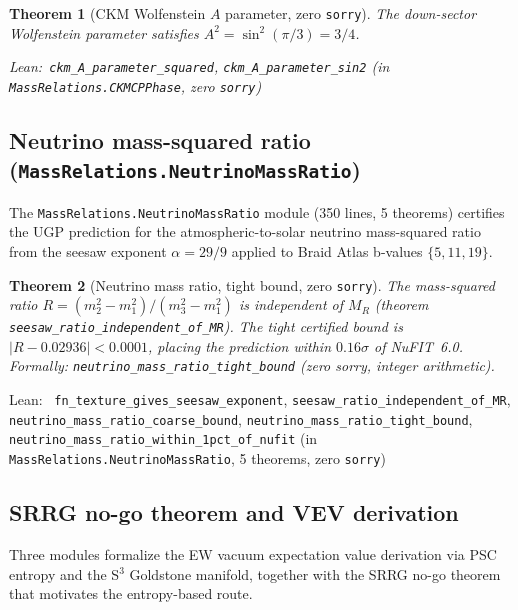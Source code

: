 \documentclass[11pt,a4paper]{article}
\newenvironment{leanref}%
  {\par\smallskip\noindent\begingroup\raggedright\textup{Lean:}~}%
  {\par\endgroup}
\newtheorem{theorem}{Theorem}[section]
\theoremstyle{definition}
\begin{document}
\begin{theorem}[CKM Wolfenstein $A$ parameter, zero \texttt{sorry}]\label{thm:ckm-a-parameter}
The down-sector Wolfenstein parameter satisfies $A^2=\sin^2(\pi/3)=3/4$.

\begin{leanref}\lstinline|ckm_A_parameter_squared|,
\lstinline|ckm_A_parameter_sin2|
\textup{(in \texttt{MassRelations.CKMCPPhase}, zero \texttt{sorry})}\end{leanref}
\end{theorem}

\subsection{Neutrino mass-squared ratio (\texttt{MassRelations.NeutrinoMassRatio})}\label{subsec:neutrino-mass-ratio}

The \texttt{MassRelations.NeutrinoMassRatio} module (350 lines, 5 theorems) certifies
the UGP prediction for the atmospheric-to-solar neutrino mass-squared ratio from the
seesaw exponent $\alpha = 29/9$ applied to Braid Atlas b-values $\{5, 11, 19\}$.

\begin{theorem}[Neutrino mass ratio, tight bound, zero \texttt{sorry}]
The mass-squared ratio
$R = (m_2^2 - m_1^2)/(m_3^2 - m_1^2)$ is independent of $M_R$
(theorem \lstinline|seesaw_ratio_independent_of_MR|).
The tight certified bound is $|R - 0.02936| < 0.0001$, placing the prediction
within $0.16\sigma$ of NuFIT~6.0. Formally:
\lstinline|neutrino_mass_ratio_tight_bound| (zero sorry, integer arithmetic).
\end{theorem}

\begin{leanref}
\lstinline|fn_texture_gives_seesaw_exponent|, \lstinline|seesaw_ratio_independent_of_MR|,
\lstinline|neutrino_mass_ratio_coarse_bound|, \lstinline|neutrino_mass_ratio_tight_bound|,
\lstinline|neutrino_mass_ratio_within_1pct_of_nufit|
\textup{(in \texttt{MassRelations.NeutrinoMassRatio}, 5 theorems, zero \texttt{sorry})}
\end{leanref}

\subsection{SRRG no-go theorem and VEV derivation}\label{sec:vev-proof}

Three modules formalize the EW vacuum expectation value derivation via PSC entropy
and the S$^3$ Goldstone manifold, together with the SRRG no-go theorem that motivates
the entropy-based route.
\end{document}
